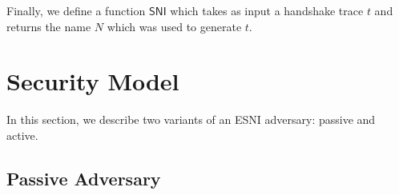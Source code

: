 \documentclass{article}
\begin{document}
Finally, we define a function $\mathsf{SNI}$ which takes as input a handshake trace $t$
and returns the name $N$ which was used to generate $t$. 





\section{Security Model}

In this section, we describe two variants of an ESNI adversary: passive and active.

\subsection{Passive Adversary}
\end{document}
